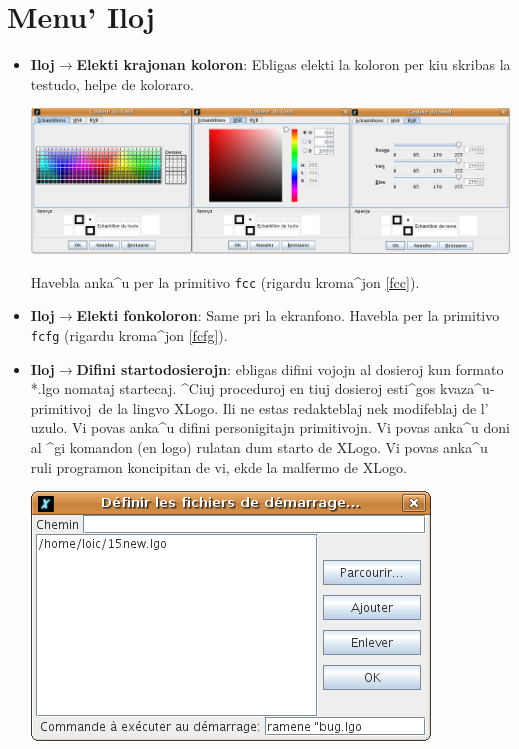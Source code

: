 \section{Menu' \og Iloj\fg}
\begin{itemize}
\item \textbf{Iloj$\to$Elekti krajonan koloron}: Ebligas elekti la
  koloron per kiu skribas la testudo, helpe de koloraro.
\begin{center}
 \includegraphics[scale=0.3]{bildoj/CaptureCouleur.png}
\end{center}
\vspace{0.25cm}
Havebla anka^u per la primitivo \texttt{fcc} (rigardu kroma^jon \ref{fcc}).
\item \textbf{Iloj$\to$Elekti fonkoloron}: Same pri la ekranfono.
  Havebla per la primitivo \texttt{fcfg} (rigardu kroma^jon \ref{fcfg}).
\item \textbf{Iloj$\to$Difini startodosierojn}: ebligas difini vojojn
  al dosieroj kun formato *.lgo nomataj \og startecaj\fg.  ^Ciuj
  proceduroj en tiuj dosieroj esti^gos \og kvaza^u-primitivoj\fg \ de
  la lingvo XLogo.  Ili ne estas redakteblaj nek modifeblaj de l'
  uzulo.  Vi povas anka^u difini personigitajn primitivojn.  Vi povas
  anka^u doni al ^gi komandon (en logo) rulatan dum starto de XLogo.
  Vi povas anka^u ruli programon koncipitan de vi, ekde la malfermo de
  XLogo.
  \begin{center}
    \includegraphics[scale=0.4]{bildoj/CaptureDemarrage.png}

\end{center}
\end{itemize}
